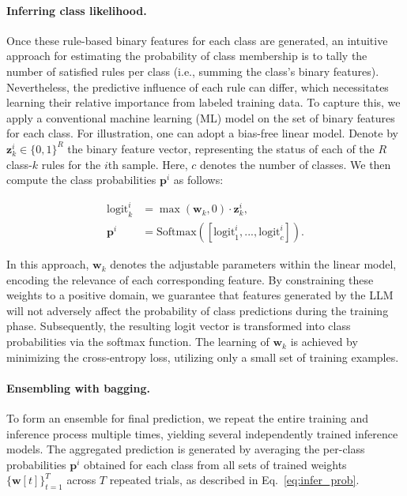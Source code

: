 \vspace*{-0.12in}
\paragraph{Inferring class likelihood.} Once these rule-based binary features for each class are generated, an intuitive approach for estimating the probability of class membership is to tally the number of satisfied rules per class (i.e., summing the class's binary features). Nevertheless, the predictive influence of each rule can differ, which necessitates learning their relative importance from labeled training data. To capture this, we apply a conventional machine learning (ML) model on the set of binary features for each class. For illustration, one can adopt a bias-free linear model. Denote by $\mathbf{z}_k^i \in \{0, 1\}^R$ the binary feature vector, representing the status of each of the $R$ class-$k$ rules for the $i$th sample. Here, $c$ denotes the number of classes. We then compute the class probabilities $\mathbf{p}^i$ as follows:

\begin{align}
\text{logit}_k^i &= \max(\mathbf{w}_k, 0) \cdot \mathbf{z}_k^i, \nonumber \\
\mathbf{p}^i &= \text{Softmax}({[\text{logit}_{1}^i, ..., \text{logit}_{c}^i]}). \label{eq:infer_prob}
\end{align}

In this approach, $\mathbf{w}_k$ denotes the adjustable parameters within the linear model, encoding the relevance of each corresponding feature. By constraining these weights to a positive domain, we guarantee that features generated by the LLM will not adversely affect the probability of class predictions during the training phase. Subsequently, the resulting logit vector is transformed into class probabilities via the softmax function. The learning of $\mathbf{w}_k$ is achieved by minimizing the cross-entropy loss, utilizing only a small set of training examples.

\vspace*{-0.12in}
\paragraph{Ensembling with bagging.} To form an ensemble for final prediction, we repeat the entire training and inference process multiple times, yielding several independently trained inference models. The aggregated prediction is generated by averaging the per-class probabilities $\mathbf{p}^i$ obtained for each class from all sets of trained weights $\{\mathbf{w}[t]\}_{t=1}^T$ across $T$ repeated trials, as described in Eq.~\ref{eq:infer_prob}.

